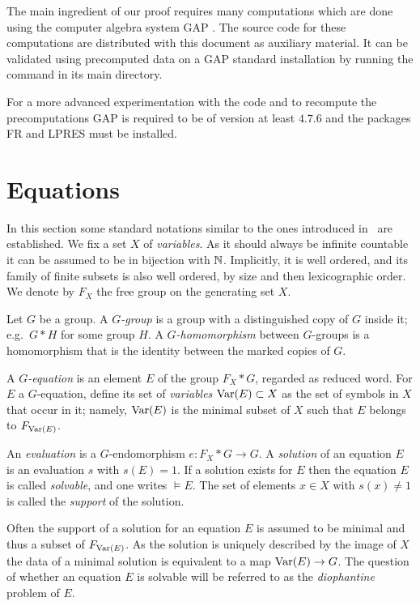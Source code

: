 \documentclass[a4paper,11pt]{amsart}
\begin{document}
The main ingredient of our proof requires many computations which are 
done using the computer algebra system GAP \cite{GAP4}. The source code
for these computations are distributed with this document as auxiliary material. It can
be validated using precomputed data on a GAP standard installation
by running the command  in its main directory.

For a more advanced experimentation with the code and to recompute 
the precomputations GAP is required to be of version at least $4.7.6$ 
and the packages FR\cite{FR2.3.6} and 
LPRES\cite{LPRES0.3.0} must be installed.

\section{Equations}
In this section some standard notations similar to the ones introduced
in~\cite{ComerfordEquationsFreeGroups} are established. We fix a set
$X$ of \emph{variables}. As it should always be infinite countable it
can be assumed to be in bijection with $\mathbb{N}$. Implicitly, it is well
ordered, and its family of finite subsets is also well ordered, by
size and then lexicographic order. We denote by $F_X$ the free group
on the generating set $X$.

\begin{defi}
  Let $G$ be a group. A \emph{$G$-group} is a group with a
  distinguished copy of $G$ inside it; e.g.\ $G*H$ for some group
  $H$. A \emph{$G$-homomorphism} between $G$-groups is a homomorphism
  that is the identity between the marked copies of $G$.

  A \emph{$G$-equation} is an element $E$ of the group $F_X * G$,
  regarded as reduced word. For $E$ a $G$-equation, define its set of
  \emph{variables} $\textup{Var}(E)\subset X$ as the set of symbols in $X$
  that occur in it; namely, $\textup{Var}(E)$ is the minimal subset of $X$
  such that $E$ belongs to $F_{\textup{Var}(E)}$.

  An \emph{evaluation} is a $G$-endomorphism $e\colon F_X * G \to G$.
  A \emph{solution} of an equation $E$ is an evaluation $s$ with
  $s(E)=1$. If a solution exists for $E$ then the equation $E$ is
  called \emph{solvable}, and one writes $\models E$.  The set of
  elements $x\in X$ with $s(x)\neq 1$ is called the \emph{support} of
  the solution.
\end{defi}

Often the support of a solution for an equation $E$ is assumed to be
minimal and thus a subset of $F_{\textup{Var}(E)}$.  As the solution is
uniquely described by the image of $X$ the data of a minimal solution
is equivalent to a map $\textup{Var}(E) \to G$.  The question of whether an
equation $E$ is solvable will be referred to as the \emph{diophantine}
problem of $E$.
\end{document}
